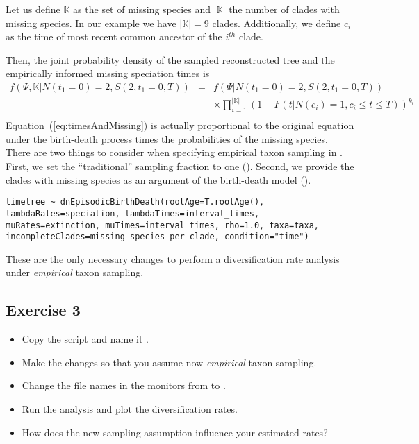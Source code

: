Let us define $\mathbb{K}$ as the set of missing species and $|\mathbb{K}|$ the number of clades with missing species.
In our example we have $|\mathbb{K}| = 9$ clades.
Additionally, we define $c_i$ as the time of most recent common ancestor of the $i^{th}$ clade.

Then, the joint probability density of the sampled reconstructed tree and the empirically informed missing speciation times is
\begin{eqnarray}
f(\Psi,\mathbb{K}|N(t_1\!=\!0)\!=\!2,S(2,t_1\!=\!0,T))  & = & f(\Psi|N(t_1\!=\!0)\!=\!2,S(2,t_1\!=\!0,T)) \nonumber \\
& &  \times\prod_{i=1}^{|\mathbb{K}|}\left(1-F(t|N(c_{i})=1,c_{i}\leq t \leq T)\right)^{k_i}  \nonumber\\ \label{eq:timesAndMissing}
\end{eqnarray}
Equation~(\ref{eq:timesAndMissing}) is actually proportional to the original equation under the birth-death process times the probabilities of the missing species.
There are two things to consider when specifying empirical taxon sampling in \RevBayes.
First, we set the ``traditional'' sampling fraction to one ().
Second, we provide the clades with missing species as an argument of the birth-death model ().
{\tt \begin{snugshade*}
\begin{lstlisting}
timetree ~ dnEpisodicBirthDeath(rootAge=T.rootAge(), lambdaRates=speciation, lambdaTimes=interval_times, muRates=extinction, muTimes=interval_times, rho=1.0, taxa=taxa, incompleteClades=missing_species_per_clade, condition="time")
\end{lstlisting}
\end{snugshade*}}
These are the only necessary changes to perform a diversification rate analysis under \emph{empirical} taxon sampling.



\subsection{Exercise 3}

\begin{itemize}
\item Copy the \Rev script  and name it .
\item Make the changes so that you assume now \emph{empirical} taxon sampling.
\item Change the file names in the monitors from  to .
\item Run the analysis and plot the diversification rates.
\item How does the new sampling assumption influence your estimated rates?
\end{itemize}




